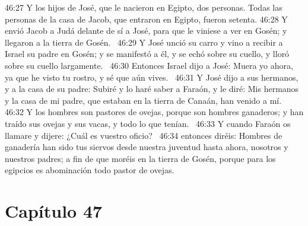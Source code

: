 46:27 Y los hijos de José, que le nacieron en Egipto, dos personas. Todas las personas de la casa de Jacob, que entraron en Egipto, fueron setenta. 
46:28 Y envió Jacob a Judá delante de sí a José, para que le viniese a ver en Gosén; y llegaron a la tierra de Gosén.  
46:29 Y José unció su carro y vino a recibir a Israel su padre en Gosén; y se manifestó a él, y se echó sobre su cuello, y lloró sobre su cuello largamente.  
46:30 Entonces Israel dijo a José: Muera yo ahora, ya que he visto tu rostro, y sé que aún vives.  
46:31 Y José dijo a sus hermanos, y a la casa de su padre: Subiré y lo haré saber a Faraón, y le diré: Mis hermanos y la casa de mi padre, que estaban en la tierra de Canaán, han venido a mí.  
46:32 Y los hombres son pastores de ovejas, porque son hombres ganaderos; y han traído sus ovejas y sus vacas, y todo lo que tenían.  
46:33 Y cuando Faraón os llamare y dijere: ¿Cuál es vuestro oficio?  
46:34 entonces diréis: Hombres de ganadería han sido tus siervos desde nuestra juventud hasta ahora, nosotros y nuestros padres; a fin de que moréis en la tierra de Gosén, porque para los egipcios es abominación todo pastor de ovejas.  
\section*{Capítulo 47}

